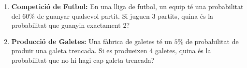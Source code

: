 \documentclass[12pt]{article}
\begin{document}
\begin{exercici} [title=]  \noindent  
\begin{enumerate}[start=4]
    \item \textbf{Competició de Futbol:}  
    En una lliga de futbol, un equip té una probabilitat del $60\%$ de guanyar qualsevol partit. Si juguen 3 partits, quina és la probabilitat que guanyin exactament 2?

    \item \textbf{Producció de Galetes:}  
    Una fàbrica de galetes té un $5\%$ de probabilitat de produir una galeta trencada. Si es produeixen 4 galetes, quina és la probabilitat que no hi hagi cap galeta trencada?


\end{enumerate}
\end{exercici}
\end{document}
